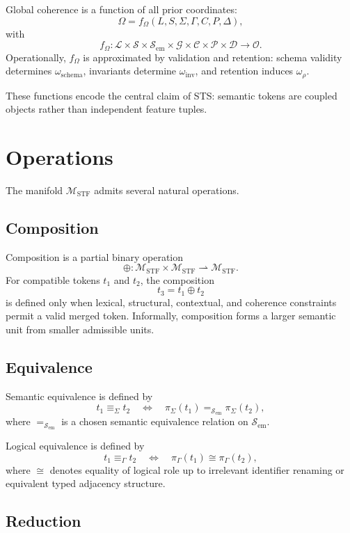 \documentclass{article}
\newcommand{\STS}{{\normalfont\textsc{STS}}}
\newcommand{\Lex}{\mathcal{L}}
\newcommand{\Syn}{\mathcal{S}}
\newcommand{\Sem}{\mathcal{S}_{\mathrm{em}}}
\newcommand{\Rel}{\mathcal{G}}
\newcommand{\Ctx}{\mathcal{C}}
\newcommand{\Prag}{\mathcal{P}}
\newcommand{\Temp}{\mathcal{D}}
\newcommand{\Coh}{\mathcal{O}}
\newcommand{\Manifold}{\mathcal{M}_{\mathrm{STF}}}
\begin{document}
Global coherence is a function of all prior coordinates:
\[
\Omega = f_\Omega(L,S,\Sigma,\Gamma,C,P,\Delta),
\]
with
\[
f_\Omega : \Lex \times \Syn \times \Sem \times \Rel \times \Ctx \times \Prag \times \Temp \to \Coh.
\]
Operationally, \(f_\Omega\) is approximated by validation and retention: schema validity determines \(\omega_{\mathrm{schema}}\), invariants determine \(\omega_{\mathrm{inv}}\), and retention induces \(\omega_{\rho}\).

These functions encode the central claim of \STS{}: semantic tokens are coupled objects rather than independent feature tuples.

\section{Operations}

The manifold \(\Manifold\) admits several natural operations.

\subsection*{Composition}

Composition is a partial binary operation
\[
\oplus : \Manifold \times \Manifold \rightharpoonup \Manifold.
\]
For compatible tokens \(t_1\) and \(t_2\), the composition
\[
t_3 = t_1 \oplus t_2
\]
is defined only when lexical, structural, contextual, and coherence constraints permit a valid merged token. Informally, composition forms a larger semantic unit from smaller admissible units.

\subsection*{Equivalence}

Semantic equivalence is defined by
\[
t_1 \equiv_\Sigma t_2
\quad \Longleftrightarrow \quad
\pi_\Sigma(t_1) =_{\Sem} \pi_\Sigma(t_2),
\]
where \(=_{\Sem}\) is a chosen semantic equivalence relation on \(\Sem\).

Logical equivalence is defined by
\[
t_1 \equiv_\Gamma t_2
\quad \Longleftrightarrow \quad
\pi_\Gamma(t_1) \cong \pi_\Gamma(t_2),
\]
where \(\cong\) denotes equality of logical role up to irrelevant identifier renaming or equivalent typed adjacency structure.

\subsection*{Reduction}
\end{document}

